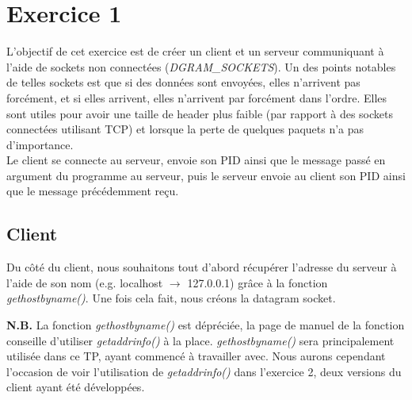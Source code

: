 \section{Exercice 1}
L'objectif de cet exercice est de créer un client et un serveur communiquant à l'aide de sockets non connectées (\emph{DGRAM\_SOCKETS}). Un des points notables de telles sockets est que si des données sont envoyées, elles n'arrivent pas forcément, et si elles arrivent, elles n'arrivent par forcément dans l'ordre. Elles sont utiles pour avoir une taille de header plus faible (par rapport à des sockets connectées utilisant TCP) et lorsque la perte de quelques paquets n'a pas d'importance.\\

Le client se connecte au serveur, envoie son PID ainsi que le message passé en argument du programme au serveur, puis le serveur envoie au client son PID ainsi que le message précédemment reçu.

\subsection{Client}
Du côté du client, nous souhaitons tout d'abord récupérer l'adresse du serveur à l'aide de son nom (e.g. localhost $\rightarrow$ 127.0.0.1) grâce à la fonction \emph{gethostbyname()}. Une fois cela fait, nous créons la datagram socket.\\

\begin{mdframed}[backgroundcolor=hintbg, linecolor=hintborder]
\noindent \textbf{N.B.} La fonction \emph{gethostbyname()} est dépréciée, la page de manuel de la fonction conseille d'utiliser \emph{getaddrinfo()} à la place. \emph{gethostbyname()} sera principalement utilisée dans ce TP, ayant commencé à travailler avec. Nous aurons cependant l'occasion de voir l'utilisation de \emph{getaddrinfo()} dans l'exercice 2, deux versions du client ayant été développées.
\end{mdframed}

